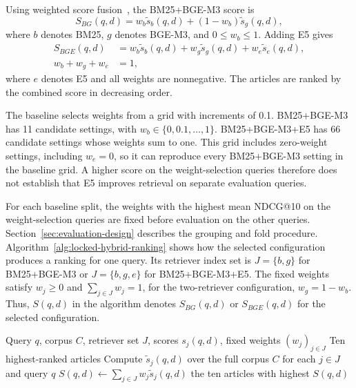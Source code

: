 Using weighted score fusion~\cite{bruch2022}, the BM25+BGE-M3 score is
\[
S_{BG}(q,d)
=w_b\widetilde{s}_{b}(q,d)+(1-w_b)\widetilde{s}_{g}(q,d),
\]
where \(b\) denotes BM25, \(g\) denotes BGE-M3, and \(0\leq w_b\leq1\). Adding E5 gives
\[
\begin{aligned}
S_{BGE}(q,d)
&=w_b\widetilde{s}_{b}(q,d)+w_g\widetilde{s}_{g}(q,d)
+w_e\widetilde{s}_{e}(q,d),\\
w_b+w_g+w_e&=1,
\end{aligned}
\]
where \(e\) denotes E5 and all weights are nonnegative. The articles are ranked by the combined score in decreasing order.

The baseline selects weights from a grid with increments of 0.1. BM25+BGE-M3 has 11 candidate settings, with \(w_b\in\{0,0.1,\ldots,1\}\). BM25+BGE-M3+E5 has 66 candidate settings whose weights sum to one. This grid includes zero-weight settings, including \(w_e=0\), so it can reproduce every BM25+BGE-M3 setting in the baseline grid. A higher score on the weight-selection queries therefore does not establish that E5 improves retrieval on separate evaluation queries.

For each baseline split, the weights with the highest mean NDCG@10 on the weight-selection queries are fixed before evaluation on the other queries. Section~\ref{sec:evaluation-design} describes the grouping and fold procedure. Algorithm~\ref{alg:locked-hybrid-ranking} shows how the selected configuration produces a ranking for one query. Its retriever index set is \(J=\{b,g\}\) for BM25+BGE-M3 or \(J=\{b,g,e\}\) for BM25+BGE-M3+E5. The fixed weights satisfy \(w_j\geq0\) and \(\sum_{j\in J}w_j=1\), for the two-retriever configuration, \(w_g=1-w_b\). Thus, \(S(q,d)\) in the algorithm denotes \(S_{BG}(q,d)\) or \(S_{BGE}(q,d)\) for the selected configuration.

\begin{algorithm}[H]
\caption{Article ranking with fixed fusion weights}
\label{alg:locked-hybrid-ranking}
\footnotesize
\begin{algorithmic}[1]
\Require Query $q$, corpus $C$, retriever set $J$, scores $s_j(q,d)$, fixed weights $(w_j)_{j\in J}$
\Ensure Ten highest-ranked articles
\State Compute $\widetilde{s}_j(q,d)$ over the full corpus $C$ for each $j\in J$ and query $q$
    \State $S(q,d)\gets\sum_{j\in J}w_j\widetilde{s}_j(q,d)$
\EndFor
\State \Return the ten articles with highest $S(q,d)$
\end{algorithmic}
\end{algorithm}

